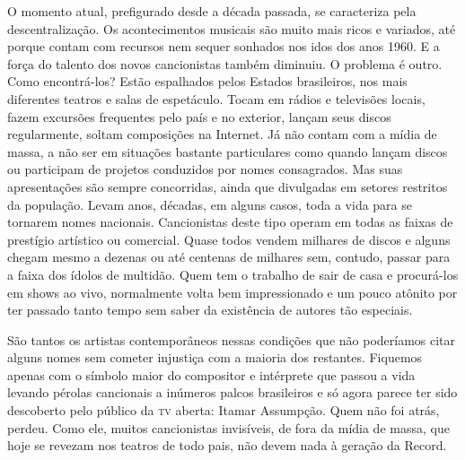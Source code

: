 O momento atual, prefigurado desde a década passada, se caracteriza pela
descentralização. Os acontecimentos musicais são muito mais ricos e
variados, até porque contam com recursos nem sequer sonhados nos idos
dos anos 1960. E a força do talento dos novos cancionistas também
diminuiu. O problema é outro. Como encontrá-los? Estão espalhados pelos
Estados brasileiros, nos mais diferentes teatros e salas de espetáculo.
Tocam em rádios e televisões locais, fazem excursões frequentes pelo
país e no exterior, lançam seus discos regularmente, soltam composições
na Internet. Já não contam com a mídia de massa, a não ser em situações
bastante particulares como quando lançam discos ou participam de
projetos conduzidos por nomes consagrados. Mas suas apresentações são
sempre concorridas, ainda que divulgadas em setores restritos da
população. Levam anos, décadas, em alguns casos, toda a vida para se
tornarem nomes nacionais. Cancionistas deste tipo operam em todas as
faixas de prestígio artístico ou comercial. Quase todos vendem milhares
de discos e alguns chegam mesmo a dezenas ou até centenas de milhares
sem, contudo, passar para a faixa dos ídolos de multidão. Quem tem o
trabalho de sair de casa e procurá-los em shows ao vivo, normalmente
volta bem impressionado e um pouco atônito por ter passado tanto tempo
sem saber da existência de autores tão especiais.

São tantos os artistas contemporâneos nessas condições que não
poderíamos citar alguns nomes sem cometer injustiça com a maioria dos
restantes. Fiquemos apenas com o símbolo maior do compositor e
intérprete que passou a vida levando pérolas cancionais a inúmeros
palcos brasileiros e só agora parece ter sido descoberto pelo público da
\textsc{tv} aberta: Itamar Assumpção. Quem não foi atrás, perdeu. Como ele,
muitos cancionistas invisíveis, de fora da mídia de massa, que hoje se
revezam nos teatros de todo pais, não devem nada à geração da Record.



